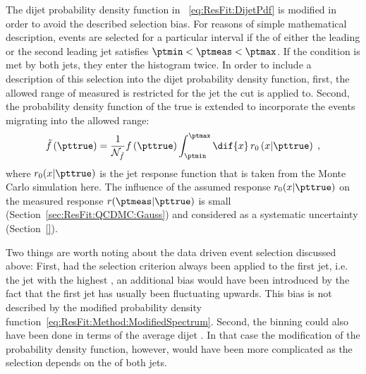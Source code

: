 The dijet probability density function in ~\eqref{eq:ResFit:DijetPdf} is modified in order to avoid the described selection bias.
For reasons of simple mathematical description, events are selected for a particular interval if the \pt of either the leading or the second leading jet satisfies $\ptmin < \ptmeas < \ptmax$.
If the condition is met by both jets, they enter the histogram twice.
In order to include a description of this selection into the dijet probability density function, first, the allowed range of measured \pt is restricted for the jet the \pt cut is applied to.
Second, the probability density function of the true \pt is extended to incorporate the events migrating into the allowed \pt range:
\begin{equation}
  \label{eq:ResFit:Method:ModifiedSpectrum}
  \tilde{f}\left(\pttrue\right) = \frac{1}{\mathcal{N}_{\tilde{f}}}
  f\left(\pttrue\right) \int^{\ptmax}_{\ptmin}\dif{x}\,r_{0}\left(x|\pttrue\right) \; ,
\end{equation}
where $r_{0}(x|\pttrue)$ is the jet \pt response function that is taken from the Monte Carlo simulation here.
The influence of the assumed response $r_{0}(x|\pttrue)$ on the measured response $r(\ptmeas|\pttrue)$ is small (Section~\ref{sec:ResFit:QCDMC:Gauss}) and considered as a systematic uncertainty (Section~\ref{}).

Two things are worth noting about the data driven event selection discussed above:
First, had the selection criterion always been applied to the first jet, i.e. the jet with the highest \ptmeas, an additional bias would have been introduced by the fact that the first jet has usually been fluctuating upwards.
This bias is not described by the modified probability density function~\eqref{eq:ResFit:Method:ModifiedSpectrum}.
Second, the binning could also have been done in terms of the average dijet \pt.
In that case the modification of the probability density function, however, would have been more complicated as the selection depends on the \pt of both jets.
